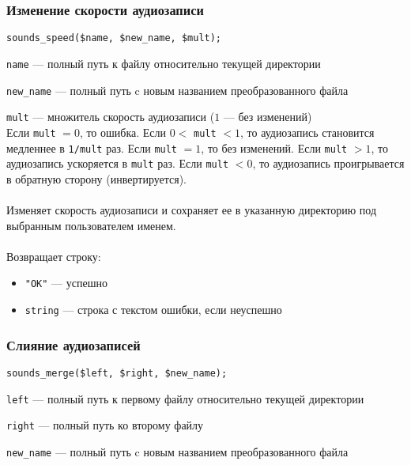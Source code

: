 \documentclass[14pt,a4paper]{article}
\begin{document}
\subsubsection*{Изменение скорости аудиозаписи}

\begin{lstlisting}
sounds_speed($name, $new_name, $mult);
\end{lstlisting}

\lstinline{name} --- полный путь к файлу относительно текущей директории \par
\lstinline{new_name} --- полный путь c новым названием преобразованного файла \par
\lstinline{mult} --- множитель скорость аудиозаписи ($1$ --- без изменений) \\

\noindent Если \lstinline{mult} $= 0$, то ошибка. Если $0 <$ \lstinline{mult} $< 1$, то аудиозапись становится медленнее в \lstinline{1/mult} раз. Если \lstinline{mult} $= 1$, то без изменений. Если \lstinline{mult} $> 1$, то аудиозапись ускоряется в \lstinline{mult} раз. Если \lstinline{mult} $< 0$, то аудиозапись проигрывается в обратную сторону (инвертируется).\\\\
Изменяет скорость аудиозаписи и сохраняет ее в указанную директорию под выбранным пользователем именем. \\\\
Возвращает строку:
\smallskip
\begin{itemize}
\item \lstinline{"OK"} --- успешно
\item \lstinline{string} --- строка с текстом ошибки, если неуспешно
\end{itemize}

\subsubsection*{Слияние аудиозаписей}

\begin{lstlisting}
sounds_merge($left, $right, $new_name);
\end{lstlisting}

\lstinline{left} --- полный путь к первому файлу относительно текущей директории \par
\lstinline{right} --- полный путь ко второму файлу \par
\lstinline{new_name} --- полный путь c новым названием преобразованного файла \\
\end{document}
